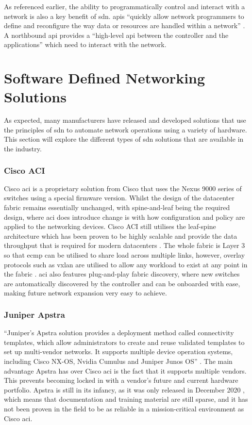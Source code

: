 As referenced earlier, the ability to programmatically control and interact with a network is also a key benefit of \gls{sdn}. \gls{api}s ``quickly allow network programmers to define and reconfigure the way data or resources are handled within a network'' \citep{9}. A northbound \gls{api} provides a ``high-level \gls{api} between the controller and the applications'' \citep{6844664} which need to interact with the network.
\section{Software Defined Networking Solutions}
\label{litreview:types}
As expected, many manufacturers have released and
developed solutions that use the principles of \gls{sdn} to automate network
operations using a variety of hardware. This section will explore the different
types of \gls{sdn} solutions that are available in the industry.

\subsubsection{Cisco ACI}
Cisco \gls{aci} is a proprietary solution from Cisco
that uses the Nexus 9000 series of switches using a special firmware version.
Whilst the design of the datacenter fabric remains essentially unchanged, with
spine-and-leaf being the required design, where \gls{aci} does introduce change
is with how configuration and policy are applied to the networking devices.
Cisco ACI still utilises the leaf-spine architecture which has been proven to
be highly scalable and provide the data throughput that is required for modern
datacenters \citep{7}. The whole fabric is Layer 3 so that \gls{ecmp} can be utilised to
share load across multiple links, however, overlay protocols such as
\gls{vxlan} are utilised to allow any workload to exist at any point in the
fabric \citep{duffy2014cisco}.
\gls{aci} also features plug-and-play fabric
discovery, where new switches are automatically discovered by the controller
and can be onboarded with ease, making future network expansion very easy to
achieve.

\subsubsection{Juniper Apstra}
``Juniper’s Apstra solution provides
a
deployment method called connectivity templates, which allow administrators to
create and reuse validated templates to set up multi-vendor networks. It
supports multiple device operation systems, including Cisco NX-OS, Nvidia
Cumulus and Juniper Junos OS'' \citep{9914530}. The main advantage Apstra has over Cisco
\gls{aci} is the fact that it supports multiple vendors. This prevents becoming locked in with a vendor's future and current hardware portfolio. Apstra is still in its
infancy, as it was only released in December 2020 \citep{9914530}, which means
that documentation and training material are still sparse, and it has not been
proven in the field to be as reliable in a mission-critical environment as
Cisco \gls{aci}.

